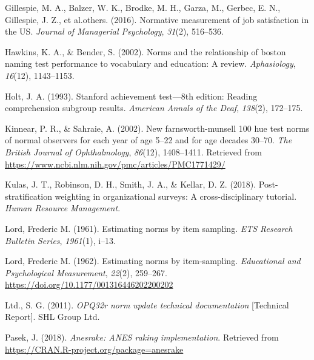 \documentclass[
  ,man]{apa6}
\newlength{\cslhangindent}
\newlength{\cslentryspacingunit} %
\newenvironment{CSLReferences}[2] %
 {%
  \setlength{\parindent}{0pt}
  \ifodd #1
  \let\oldpar\par
  \def\par{\hangindent=\cslhangindent\oldpar}
  \fi
  \setlength{\parskip}{#2\cslentryspacingunit}
 }%
 {}
\begin{document}
\hypertarget{refs}{}
\begin{CSLReferences}{1}{0}
\leavevmode{}%
Gillespie, M. A., Balzer, W. K., Brodke, M. H., Garza, M., Gerbec, E. N., Gillespie, J. Z., et al.others. (2016). Normative measurement of job satisfaction in the US. \emph{Journal of Managerial Psychology}, \emph{31}(2), 516--536.

\leavevmode{}%
Hawkins, K. A., \& Bender, S. (2002). Norms and the relationship of boston naming test performance to vocabulary and education: A review. \emph{Aphasiology}, \emph{16}(12), 1143--1153.

\leavevmode{}%
Holt, J. A. (1993). Stanford achievement test---8th edition: Reading comprehension subgroup results. \emph{American Annals of the Deaf}, \emph{138}(2), 172--175.

\leavevmode{}%
Kinnear, P. R., \& Sahraie, A. (2002). New farnsworth-munsell 100 hue test norms of normal observers for each year of age 5--22 and for age decades 30--70. \emph{The British Journal of Ophthalmology}, \emph{86}(12), 1408--1411. Retrieved from \url{https://www.ncbi.nlm.nih.gov/pmc/articles/PMC1771429/}

\leavevmode{}%
Kulas, J. T., Robinson, D. H., Smith, J. A., \& Kellar, D. Z. (2018). Post-stratification weighting in organizational surveys: A cross-disciplinary tutorial. \emph{Human Resource Management}.

\leavevmode{}%
Lord, Frederic M. (1961). Estimating norms by item sampling. \emph{ETS Research Bulletin Series}, \emph{1961}(1), i--13.

\leavevmode{}%
Lord, Frederic M. (1962). Estimating norms by item-sampling. \emph{Educational and Psychological Measurement}, \emph{22}(2), 259--267. \url{https://doi.org/10.1177/001316446202200202}

\leavevmode{}%
Ltd., S. G. (2011). \emph{OPQ32r norm update technical documentation} {[}Technical Report{]}. SHL Group Ltd.

\leavevmode{}%
Pasek, J. (2018). \emph{Anesrake: ANES raking implementation}. Retrieved from \url{https://CRAN.R-project.org/package=anesrake}


\end{CSLReferences}
\end{document}
